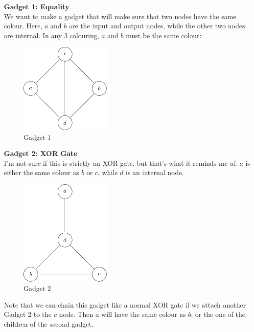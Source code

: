 \begin{description}
  \item \textbf{Gadget 1: Equality}\\
    We want to make a gadget that will make sure that two nodes have the same 
    colour. Here, $a$ and $b$ are the input and output nodes, while the other 
    two nodes are internal. In any $3$ colouring, $a$ and $b$ must be the same  
    colour:

    \begin{figure}[H]
      \centering
      \includegraphics[width=0.4\textwidth]{diagrams/graph11}
      \caption{Gadget 1}
      \label{fig:gadget1}
    \end{figure}

  \item \textbf{Gadget 2: XOR Gate}\\
    I'm not sure if this is strictly an XOR gate, but that's what it reminds me 
    of. $a$ is either the same colour as $b$ or $c$, while $d$ is an internal 
    node.

    \begin{figure}[H]
      \centering
      \includegraphics[width=0.4\textwidth]{diagrams/graph12}
      \caption{Gadget 2}
      \label{fig:gadget2}
    \end{figure}

    Note that we can chain this gadget like a normal XOR gate if we attach
    another Gadget 2 to the $c$ node. Then $a$ will have the same colour as $b$,
    or the one of the children of the second gadget.


\end{description}
